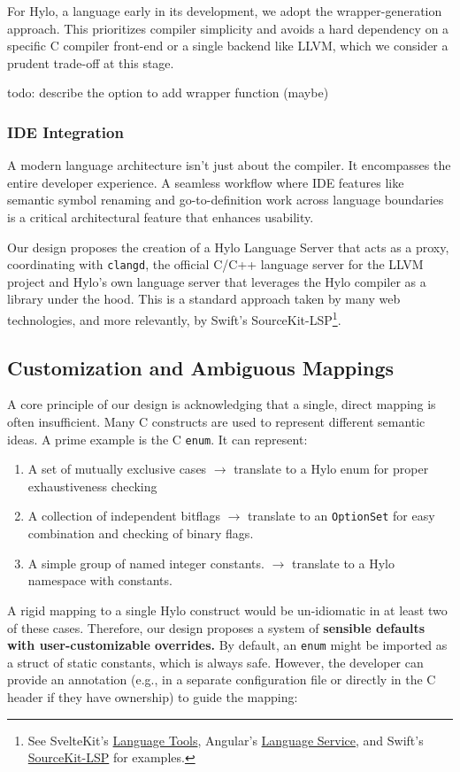 For Hylo, a language early in its development, we adopt the wrapper-generation approach. This prioritizes compiler simplicity and avoids a hard dependency on a specific C compiler front-end or a single backend like LLVM, which we consider a prudent trade-off at this stage.

todo: describe the option to add wrapper function (maybe)

\subsubsection{IDE Integration}

A modern language architecture isn't just about the compiler. It encompasses the entire developer experience. A seamless workflow where IDE features like semantic symbol renaming and go-to-definition work across language boundaries is a critical architectural feature that enhances usability.

Our design proposes the creation of a Hylo Language Server that acts as a proxy, coordinating with \texttt{clangd}, the official C/C++ language server for the LLVM project and Hylo's own language server that leverages the Hylo compiler as a library under the hood. This is a standard approach taken by many web technologies, and more relevantly, by Swift's SourceKit-LSP\footnote{See SvelteKit's \href{https://github.com/sveltejs/language-tools/}{Language Tools}, Angular's \href{https://github.com/angular/angular/tree/main/packages/language-service}{Language Service}, and Swift's \href{https://github.com/swiftlang/sourcekit-lsp}{SourceKit-LSP} for examples.}.

\subsection{Customization and Ambiguous Mappings}

A core principle of our design is acknowledging that a single, direct mapping is often insufficient. Many C constructs are used to represent different semantic ideas. A prime example is the C \texttt{enum}. It can represent:
\begin{enumerate}
    \item A set of mutually exclusive cases \(\rightarrow\) translate to a Hylo enum for proper exhaustiveness checking
    \item A collection of independent bitflags \(\rightarrow\) translate to an \texttt{OptionSet} \cite{OptionSet} for easy combination and checking of binary flags.
    \item A simple group of named integer constants. \(\rightarrow\) translate to a Hylo namespace with constants.
\end{enumerate}
A rigid mapping to a single Hylo construct would be un-idiomatic in at least two of these cases. Therefore, our design proposes a system of \textbf{sensible defaults with user-customizable overrides.} By default, an \texttt{enum} might be imported as a struct of static constants, which is always safe. However, the developer can provide an annotation (e.g., in a separate configuration file or directly in the C header if they have ownership) to guide the mapping:

